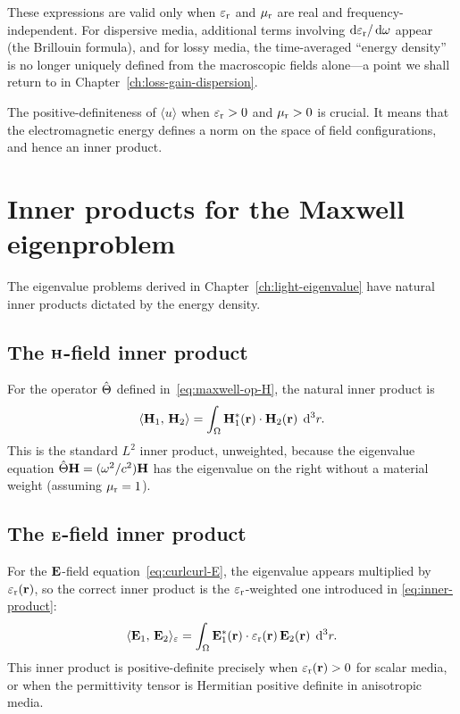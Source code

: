 These expressions are valid only when $\varepsilon_{\mathrm{r}}$ and $\mu_{\mathrm{r}}$ are real and
frequency-independent. For dispersive media, additional terms involving
$\mathop{}\!\mathrm{d}\varepsilon_{\mathrm{r}}/\mathop{}\!\mathrm{d}\omega$ appear (the Brillouin formula), and for lossy media,
the time-averaged ``energy density'' is no longer uniquely defined from
the macroscopic fields alone---a point we shall return to in
Chapter~\ref{ch:loss-gain-dispersion}.

The positive-definiteness of $\langle u\rangle$ when $\varepsilon_{\mathrm{r}} > 0$ and
$\mu_{\mathrm{r}} > 0$ is crucial. It means that the electromagnetic energy defines a
norm on the space of field configurations, and hence an inner product.


\section{Inner products for the Maxwell eigenproblem}
\label{sec:inner-products}

The eigenvalue problems derived in Chapter~\ref{ch:light-eigenvalue} have
natural inner products dictated by the energy density.

\subsection{The $\mathbf{H}$-field inner product}
\label{ssec:H-inner}

For the operator $\hat{\Theta}$ defined in~\eqref{eq:maxwell-op-H}, the natural
inner product is
\begin{equation}
 \langle\mathbf{H}_1,\,\mathbf{H}_2\rangle
 = \int_\Omega \mathbf{H}_1^*(\mathbf{r})\cdot\mathbf{H}_2(\mathbf{r})\;\mathop{}\!\mathrm{d}^3 r.
 \label{eq:H-inner}
\end{equation}
This is the standard $L^2$ inner product, unweighted, because the
eigenvalue equation $\hat{\Theta}\mathbf{H} = (\omega^2/c^2)\mathbf{H}$ has the eigenvalue on
the right without a material weight (assuming $\mu_{\mathrm{r}} = 1$).

\subsection{The $\mathbf{E}$-field inner product}
\label{ssec:E-inner}

For the $\mathbf{E}$-field equation~\eqref{eq:curlcurl-E}, the eigenvalue appears
multiplied by $\varepsilon_{\mathrm{r}}(\mathbf{r})$, so the correct inner product is the
$\varepsilon_{\mathrm{r}}$-weighted one introduced in \eqref{eq:inner-product}:
\begin{equation}
 \langle\mathbf{E}_1,\,\mathbf{E}_2\rangle_\varepsilon
 = \int_\Omega \mathbf{E}_1^*(\mathbf{r})\cdot\varepsilon_{\mathrm{r}}(\mathbf{r})\,\mathbf{E}_2(\mathbf{r})\;\mathop{}\!\mathrm{d}^3 r.
 \label{eq:E-inner-repeat}
\end{equation}
This inner product is positive-definite precisely when $\varepsilon_{\mathrm{r}}(\mathbf{r}) > 0$
for scalar media, or when the permittivity tensor is Hermitian positive
definite in anisotropic media.


